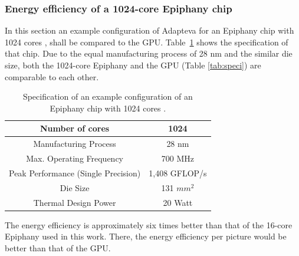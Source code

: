 \documentclass[american, hauptseminar, twoside]{zihpub}
\begin{document}
				\subsubsection*{Energy efficiency of a 1024-core Epiphany chip}  
					In this section an example configuration of Adapteva for an Epiphany chip with 1024 cores \cite{Olofsson2011}, shall be compared to the GPU. Table~\ref{tab:1024} shows the specification of that chip. 
					Due to the equal manufacturing process of 28 nm and the similar die size, both the 1024-core Epiphany and the GPU (Table \ref{tab:speci}) are comparable to each other.
					\begin{table}[H]
						\centering
						\renewcommand{\arraystretch}{1.2}
						\begin{tabular}{|c|c|}
							\hline
							Number of cores & 1024 \\
							\hline
							Manufacturing Process & 28 nm \\
							\hline
							Max. Operating Frequency & 700 MHz \\
							\hline
							Peak Performance (Single Precision) & 1,408 GFLOP/s \\
							\hline
							Die Size & 131 $mm^2$ \\
							\hline
							Thermal Design Power & 20 Watt \\
							\hline
						\end{tabular}
						\caption{Specification of an example configuration of an Epiphany chip with 1024 cores \cite{Olofsson2011}.}
						\label{tab:1024}
					\end{table}
					The energy efficiency is approximately six times better than that of the 16-core Epiphany used in this work. There, the energy efficiency per picture would be better than that of the GPU.  
	\clearpage
\end{document}
